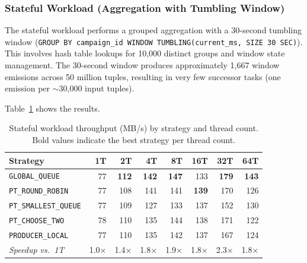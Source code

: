 \subsubsection{Stateful Workload (Aggregation with Tumbling Window)}

The stateful workload performs a grouped aggregation with a 30-second tumbling window (\texttt{GROUP BY campaign\_id WINDOW TUMBLING(current\_ms, SIZE 30 SEC)}).
This involves hash table lookups for 10,000 distinct groups and window state management.
The 30-second window produces approximately 1,667 window emissions across 50 million tuples, resulting in very few successor tasks (one emission per $\sim$30,000 input tuples).

Table~\ref{tab:stateful-strategies} shows the results.

\begin{table}[h]
\centering
\caption{Stateful workload throughput (MB/s) by strategy and thread count. Bold values indicate the best strategy per thread count.}
\label{tab:stateful-strategies}
\begin{tabular}{l|rrrrrrr}
\hline
\textbf{Strategy} & \textbf{1T} & \textbf{2T} & \textbf{4T} & \textbf{8T} & \textbf{16T} & \textbf{32T} & \textbf{64T} \\
\hline
\texttt{GLOBAL\_QUEUE}      & 77 & \textbf{112} & \textbf{142} & \textbf{147} & 133 & \textbf{179} & \textbf{143} \\
\texttt{PT\_ROUND\_ROBIN}   & 77 & 108 & 141 & 141 & \textbf{139} & 170 & 126 \\
\texttt{PT\_SMALLEST\_QUEUE}& 77 & 109 & 127 & 133 & 137 & 152 & 130 \\
\texttt{PT\_CHOOSE\_TWO}    & 78 & 110 & 135 & 144 & 138 & 171 & 122 \\
\texttt{PRODUCER\_LOCAL}    & 77 & 110 & 135 & 142 & 137 & 167 & 124 \\
\hline
\textit{Speedup vs.\ 1T}   & 1.0$\times$ & 1.4$\times$ & 1.8$\times$ & 1.9$\times$ & 1.8$\times$ & 2.3$\times$ & 1.8$\times$ \\
\hline
\end{tabular}
\end{table}

